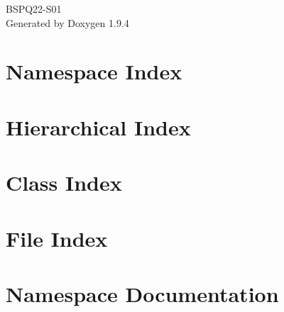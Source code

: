 \documentclass[twoside]{book}
\newcommand{\+}{\discretionary{\mbox{\scriptsize$\hookleftarrow$}}{}{}}
\newcommand{\clearemptydoublepage}{%
    \newpage{\pagestyle{empty}\cleardoublepage}%
  }
\begin{document}
  \raggedbottom
    \hypersetup{pageanchor=false,
                bookmarksnumbered=true,
                pdfencoding=unicode
               }
  \begin{titlepage}
  \vspace*{7cm}
  \begin{center}%
  {\Large BSPQ22-\/\+S01}\\
  \vspace*{1cm}
  {\large Generated by Doxygen 1.9.4}\\
  \end{center}
  \end{titlepage}
  \clearemptydoublepage
  \tableofcontents
  \clearemptydoublepage
  \hypersetup{pageanchor=true}
\chapter{Namespace Index}

\chapter{Hierarchical Index}

\chapter{Class Index}

\chapter{File Index}

\chapter{Namespace Documentation}





\end{document}
